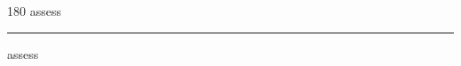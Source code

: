 
\begin{frame}
\begin{center}
\begin{turn}{180}
{\fontsize{2.5cm}{1em}\selectfont assess}
\end{turn}
\vspace{1em}\par  
\hrule
\vspace{1em}\par  
{\fontsize{2.5cm}{1em}\selectfont assess}
\end{center}
\end{frame}
